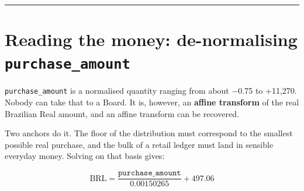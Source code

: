 \documentclass[
]{article}
\begin{document}
\begin{center}\rule{0.5\linewidth}{0.5pt}\end{center}

\section{\texorpdfstring{Reading the money: de-normalising
\texttt{purchase\_amount}}{Reading the money: de-normalising purchase\_amount}}\label{reading-the-money-de-normalising-purchase_amount}

\texttt{purchase\_amount} is a normalised quantity ranging from about
−0.75 to +11,270. Nobody can take that to a Board. It is, however, an
\textbf{affine transform} of the real Brazilian Real amount, and an
affine transform can be recovered.

Two anchors do it. The floor of the distribution must correspond to the
smallest possible real purchase, and the bulk of a retail ledger must
land in sensible everyday money. Solving on that basis gives:

\[\text{BRL} = \frac{\texttt{purchase\_amount}}{0.00150265} + 497.06\]
\end{document}
